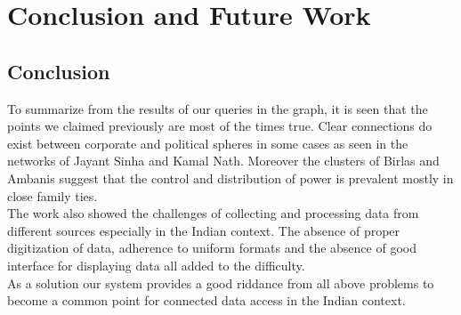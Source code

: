 \chapter{Conclusion and Future Work}
\section{Conclusion}

To summarize from the results of our queries in the graph, it is seen that the points we claimed previously are most of the times true. Clear connections do exist between corporate and political spheres in some cases as seen in the networks of Jayant Sinha and Kamal Nath. Moreover the clusters of Birlas and Ambanis suggest that the control and distribution of power is prevalent mostly in close family ties. \\

The work also showed the challenges of collecting and processing data from different sources especially in the Indian context. The absence of proper digitization of data, adherence to uniform formats and the absence of good interface for displaying data all added to the difficulty. \\

As a solution our system provides a good riddance from all above problems to become a common point for connected data access in the Indian context.\\

